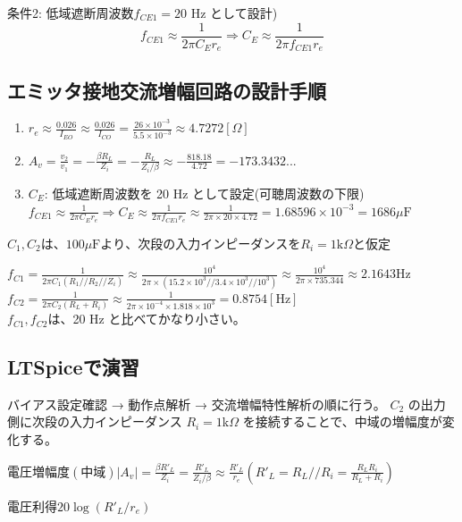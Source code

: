 条件2: 低域遮断周波数$f_{CE1} = 20$ Hz として設計)
$$f_{CE1} \approx \frac{1}{2\pi C_E r_e} \Rightarrow C_E \approx \frac{1}{2\pi f_{CE1}r_e}$$


\subsection{エミッタ接地交流増幅回路の設計手順}
\begin{enumerate}
  \setlength{\parskip}{0cm}
  \setlength{\itemsep}{0cm}
  \item $r_e \approx \frac{0.026}{I_{EO}} \approx \frac{0.026}{I_{CO}} = \frac{26\times10^{-3}}{5.5 \times 10^{-3}} \approx 4.7272 [\Omega]$
  \item $A_v = \frac{v_2}{v_1} = -\frac{\beta R_L}{Z_i} = -\frac{R_L}{Z_i/\beta} \approx -\frac{818.18}{4.72} = -173.3432...$
  \item $C_E$: 低域遮断周波数を 20 Hz として設定(可聴周波数の下限)\\
  $f_{CE1} \approx \frac{1}{2\pi C_Er_e} \Rightarrow C_E \approx \frac{1}{2\pi f_{CE1} r_e} \approx \frac{1}{2\pi \times 20 \times 4.72} = 1.68596 \times 10^{-3} = 1686 \mu\textrm{F}$
\end{enumerate}
$C_1, C_2は、100 \mu\textrm{F} より、次段の入力インピーダンスを R_i = 1\textrm{k}\Omega と仮定$

$f_{C1} = \frac{1}{2\pi C_1(R_1//R_2//Z_i)} \approx \frac{10^4}{2\pi \times (15.2\times10^3//3.4\times10^3//10^3)} \approx \frac{10^4}{2\pi \times 735.344} \approx 2.1643\textrm{Hz}$\\
$f_{C2} = \frac{1}{2\pi C_2(R_L+R_i)} \approx \frac{1}{2\pi \times 10^{-4} \times 1.818 \times 10^3} = 0.8754[\textrm{Hz}]$\\
$f_{C1}, f_{C2}$は、20 Hz と比べてかなり小さい。


\subsection{LTSpiceで演習}
バイアス設定確認 → 動作点解析 → 交流増幅特性解析の順に行う。
$C_2$ の出力側に次段の入力インピーダンス $R_i = 1$k$\Omega$ を接続することで、中域の増幅度が変化する。


$電圧増幅度(中域) |A_v| = \frac{\beta R'_L}{Z_i} = \frac{R'_L}{Z_i/\beta} \approx \frac{R'_L}{r_e}
(R'_L = R_L//R_i = \frac{R_LR_i}{R_L+R_i})$

$電圧利得 20 \log (R'_L/r_e)$

